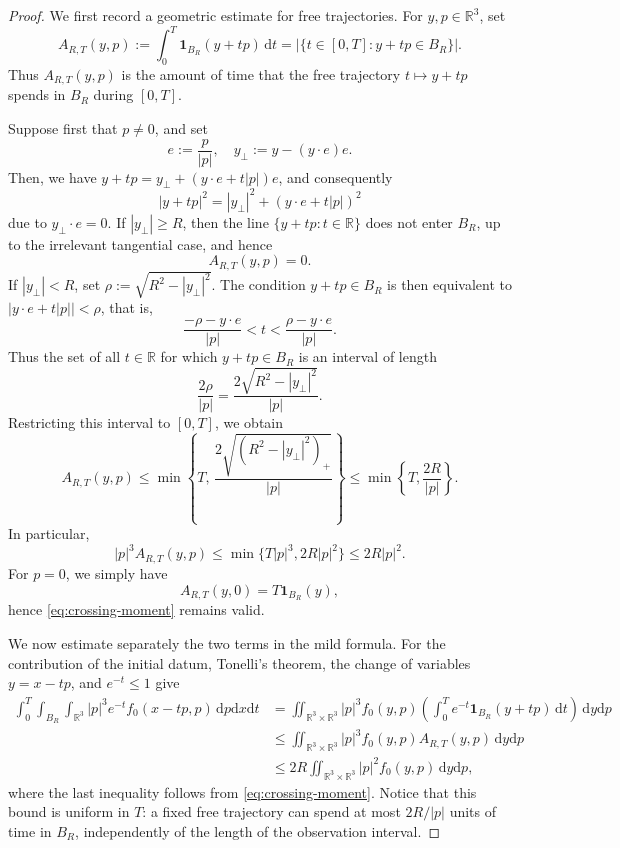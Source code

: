 \documentclass[10pt,a4paper]{amsart}
\newcommand{\R}{\mathbb R}
\newcommand{\bq}{\begin{equation}}
\newcommand{\dpp}{\mathrm{d}p}
\newcommand{\dt}{\mathrm{d}t}
\newcommand{\dx}{\mathrm{d}x}
\newcommand{\dy}{\mathrm{d}y}
\newcommand{\eq}{\end{equation}}
\newcommand{\lt}{\left}
\newcommand{\one}{\mathbf 1}
\newcommand{\rt}{\right}
\begin{document}
\begin{proof}
We first record a geometric estimate for free trajectories. For $y,p\in\R^3$, set
\[
 A_{R,T}(y,p)  :=  \int_0^T \one_{B_R}(y+tp)\,\dt  =  \lt|\{t\in[0,T]:y+tp\in B_R\}\rt|.
\]
Thus $A_{R,T}(y,p)$ is the amount of time that the free trajectory $t\mapsto y+tp$ spends in $B_R$ during $[0,T]$.

Suppose first that $p\neq0$, and set
\[
 e:=\frac{p}{|p|},  \quad  y_\perp:=y-(y\cdot e)e.
\]
Then, we have $ y+tp  =  y_\perp+(y\cdot e+t|p|)e$, and consequently
\[
 |y+tp|^2  =  |y_\perp|^2+(y\cdot e+t|p|)^2
\]
due to $y_\perp\cdot e=0$. If $|y_\perp|\geq R$, then the line $\{y+tp:t\in\R\}$ does not enter $B_R$, up to the irrelevant tangential case, and hence
\[
 A_{R,T}(y,p)=0.
\]
If $|y_\perp|<R$, set $\rho:=\sqrt{R^2-|y_\perp|^2}$. The condition $y+tp\in B_R$ is then equivalent to $ |y\cdot e+t|p||<\rho$, that is,
\[
 \frac{-\rho-y\cdot e}{|p|}  <  t  <  \frac{\rho-y\cdot e}{|p|}.
\]
Thus the set of all $t\in\R$ for which $y+tp\in B_R$ is an interval of length
\[
 \frac{2\rho}{|p|}  =  \frac{2\sqrt{R^2-|y_\perp|^2}}{|p|}.
\]
Restricting this interval to $[0,T]$, we obtain
\bq \label{eq:crossing-time}
 A_{R,T}(y,p)  \leq  \min\lt\{  T,\,  \frac{2\sqrt{(R^2-|y_\perp|^2)_+}}{|p|}  \rt\}  \leq  \min\lt\{T,\frac{2R}{|p|}\rt\}.
\eq
In particular,
\bq \label{eq:crossing-moment}
 |p|^3A_{R,T}(y,p)  \leq  \min\{T|p|^3,2R|p|^2\}  \leq  2R|p|^2.
\eq
For $p=0$, we simply have
\[
 A_{R,T}(y,0)=T\one_{B_R}(y),
\]
hence \eqref{eq:crossing-moment} remains valid.

We now estimate separately the two terms in the mild formula. For the contribution of the initial datum, Tonelli's theorem, the change of variables $y=x-tp$, and $e^{-t}\leq1$ give
\begin{align*}
 \int_0^T\int_{B_R}\int_{\R^3}  |p|^3e^{-t}f_0(x-tp,p)\,\dpp\dx\dt  &=  \iint_{\R^3\times\R^3}  |p|^3f_0(y,p)  \lt(  \int_0^T e^{-t}\one_{B_R}(y+tp)\,\dt  \rt)  \,\dy\dpp  \\
 & \leq  \iint_{\R^3\times\R^3}  |p|^3f_0(y,p)A_{R,T}(y,p)\,\dy\dpp  \\
 & \leq  2R  \iint_{\R^3\times\R^3}  |p|^2f_0(y,p)\,\dy\dpp,
\end{align*}
where the last inequality follows from \eqref{eq:crossing-moment}.  Notice that this bound is uniform in $T$: a fixed free trajectory can spend at most $2R/|p|$ units of time in $B_R$, independently of the length of the observation interval.


\end{proof}
\end{document}
